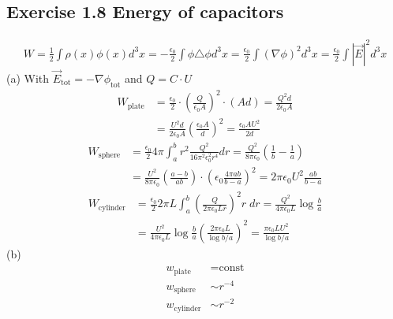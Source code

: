 \documentclass[10pt,a4paper]{book}
\theoremstyle{definition}
\begin{document}
\subsection{Exercise 1.8 Energy of capacitors}
\begin{align}
W
=\frac{1}{2}\int\rho(x)\phi(x)d^3x
=-\frac{\epsilon_0}{2}\int\phi\triangle\phi d^3x
=\frac{\epsilon_0}{2}\int(\nabla\phi)^2 d^3x
=\frac{\epsilon_0}{2}\int|\vec{E}|^2 d^3x
\end{align}
(a) With $\vec{E}_\text{tot}=-\nabla\phi_\text{tot}$ and $Q=C\cdot U$
\begin{align}
W_\text{plate}&=\frac{\epsilon_0}{2}\cdot\left(\frac{Q}{\epsilon_0A}\right)^2\cdot(Ad)=\frac{Q^2d}{2\epsilon_0A}\\
&=\frac{U^2d}{2\epsilon_0A}\left(\frac{\epsilon_0A}{d}\right)^2=
\frac{\epsilon_0AU^2}{2d}
\end{align}
\begin{align}
W_\text{sphere}&=\frac{\epsilon_0}{2}4\pi\int_a^br^2\frac{Q^2}{16\pi^2\epsilon_0^2r^4}dr=\frac{Q^2}{8\pi\epsilon_0}\left(\frac{1}{b}-\frac{1}{a}\right)\\
&=\frac{U^2}{8\pi\epsilon_0}\left(\frac{a-b}{ab}\right)\cdot\left(\epsilon_0\frac{4\pi ab}{b-a}\right)^2=2\pi\epsilon_0U^2\frac{ab}{b-a}
\end{align}
\begin{align}
W_\text{cylinder}&=\frac{\epsilon_0}{2}2\pi L\int_a^b\left(\frac{Q}{2\pi\epsilon_0Lr}\right)^2r\;dr
=\frac{Q^2}{4\pi\epsilon_0L}\log\frac{b}{a}\\
&=\frac{U^2}{4\pi\epsilon_0L}\log\frac{b}{a}\left(\frac{2\pi\epsilon_0 L}{\log b/a}\right)^2=\frac{\pi\epsilon_0LU^2}{\log b/a}
\end{align}
(b) 
\begin{align}
w_\text{plate}&=\text{const}\\
w_\text{sphere}&\sim r^{-4}\\
w_\text{cylinder}&\sim r^{-2}
\end{align}
\end{document}
